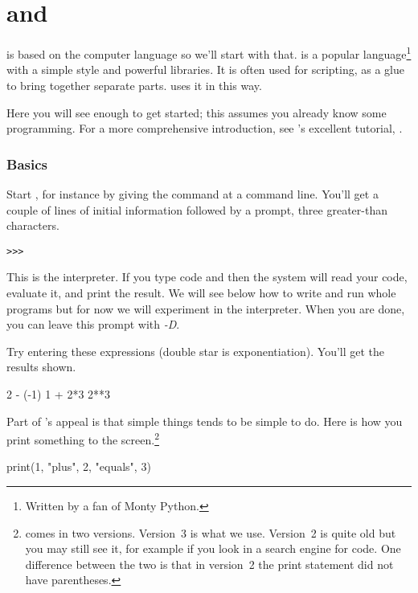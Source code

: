 \chapter{\python{} and \Sage{}}

\Sage{} is based on the computer language \python{} so we'll start with that.
\python{} is a popular language\footnote{Written by a fan of
Monty Python.} 
with a simple style and powerful libraries.
It is often used for scripting, as a glue to bring together separate parts.
\Sage{} uses it in this way.

Here you will see enough \python{} to get started; this assumes you already
know some programming.
For a more comprehensive introduction, see \python's excellent tutorial,
\cite{PythonTeam19b}.



\subsection{Basics}
Start \python, for instance by giving the command
at a command line.
You'll get a couple of lines of initial
information followed by a prompt, three greater-than
characters.
\begin{lstlisting}[style=python]
>>>   
\end{lstlisting}
This is the \python{} interpreter.
If you type 
\python{} code and  then the system
will read your code, evaluate it, and print the result.
We will see below how to write and run whole programs
but for now we will experiment in the interpreter.
When you are done, you can 
leave this prompt with \textit{-D}.

Try entering these expressions (double star is exponentiation).
You'll get the results shown.
\begin{pythonconsole}
2 - (-1)
1 + 2*3
2**3  
\end{pythonconsole}

Part of \python's appeal is that simple things tends to be simple to do.
Here is how you print something to the screen.\footnote{%
  \protect\python{} comes in two versions.
  Version~3 is what we use.
  Version~2 is quite old but you may still see it, for example if
  you look in a search engine for code.
  One difference between the two is that in version~2 the
  print statement did not have parentheses.}
\begin{pythonconsole}
print(1, "plus", 2, "equals", 3)
\end{pythonconsole}

